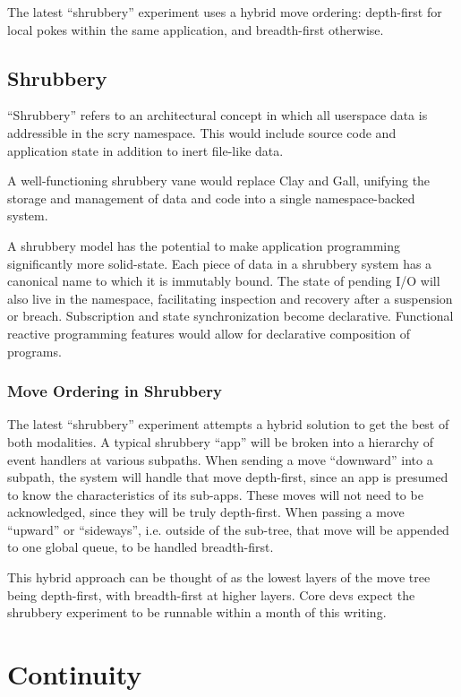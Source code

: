 \documentclass[twoside]{article}
\begin{document}
The latest ``shrubbery'' experiment uses a hybrid move ordering: depth-first for local pokes within the same application, and breadth-first otherwise.

\subsection{Shrubbery}

``Shrubbery'' refers to an architectural concept in which all userspace data is addressible in the scry namespace.  This would include source code and application state in addition to inert file-like data.

A well-functioning shrubbery vane would replace Clay and Gall, unifying the storage and management of data and code into a single namespace-backed system.

A shrubbery model has the potential to make application programming significantly more solid-state.  Each piece of data in a shrubbery system has a canonical name to which it is immutably bound.  The state of pending I/O will also live in the namespace, facilitating inspection and recovery after a suspension or breach.  Subscription and state synchronization become declarative.  Functional reactive programming features would allow for declarative composition of programs.

\subsubsection{Move Ordering in Shrubbery}

The latest ``shrubbery'' experiment attempts a hybrid solution to get the best of both modalities.  A typical shrubbery ``app'' will be broken into a hierarchy of event handlers at various subpaths.  When sending a move ``downward'' into a subpath, the system will handle that move depth-first, since an app is presumed to know the characteristics of its sub-apps.  These moves will not need to be acknowledged, since they will be truly depth-first.  When passing a move ``upward'' or ``sideways'', i.e. outside of the sub-tree, that move will be appended to one global queue, to be handled breadth-first.

This hybrid approach can be thought of as the lowest layers of the move tree being depth-first, with breadth-first at higher layers.  Core devs expect the shrubbery experiment to be runnable within a month of this writing.

\section{Continuity}
\end{document}
